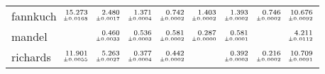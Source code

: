 \documentclass[a4paper,UKenglish]{lipics-v2016}
\begin{document}
\begin{table*}
\begin{adjustbox}{width=1.2\textwidth,center}
\begin{tabular}{lrrrrrrrr}
fannkuch&$\substack{\mathmakebox[.7cm][r]{15.273}\\{\mathmakebox[.7cm][r]{\scriptscriptstyle \pm 0.0168}}}$&$\substack{\mathmakebox[.7cm][r]{2.480}\\{\mathmakebox[.7cm][r]{\scriptscriptstyle \pm 0.0017}}}$&$\substack{\mathmakebox[.7cm][r]{1.371}\\{\mathmakebox[.7cm][r]{\scriptscriptstyle \pm 0.0004}}}$&$\substack{\mathmakebox[.7cm][r]{0.742}\\{\mathmakebox[.7cm][r]{\scriptscriptstyle \pm 0.0002}}}$&$\substack{\mathmakebox[.7cm][r]{1.403}\\{\mathmakebox[.7cm][r]{\scriptscriptstyle \pm 0.0002}}}$&$\substack{\mathmakebox[.7cm][r]{1.393}\\{\mathmakebox[.7cm][r]{\scriptscriptstyle \pm 0.0002}}}$&$\substack{\mathmakebox[.7cm][r]{0.746}\\{\mathmakebox[.7cm][r]{\scriptscriptstyle \pm 0.0002}}}$&$\substack{\mathmakebox[.7cm][r]{10.676}\\{\mathmakebox[.7cm][r]{\scriptscriptstyle \pm 0.0092}}}$\\
\addlinespace
mandel&&$\substack{\mathmakebox[.7cm][r]{0.460}\\{\mathmakebox[.7cm][r]{\scriptscriptstyle \pm 0.0033}}}$&$\substack{\mathmakebox[.7cm][r]{0.536}\\{\mathmakebox[.7cm][r]{\scriptscriptstyle \pm 0.0003}}}$&$\substack{\mathmakebox[.7cm][r]{0.581}\\{\mathmakebox[.7cm][r]{\scriptscriptstyle \pm 0.0002}}}$&$\substack{\mathmakebox[.7cm][r]{0.287}\\{\mathmakebox[.7cm][r]{\scriptscriptstyle \pm 0.0000}}}$&$\substack{\mathmakebox[.7cm][r]{0.581}\\{\mathmakebox[.7cm][r]{\scriptscriptstyle \pm 0.0001}}}$&&$\substack{\mathmakebox[.7cm][r]{4.211}\\{\mathmakebox[.7cm][r]{\scriptscriptstyle \pm 0.0112}}}$\\
\addlinespace
richards&$\substack{\mathmakebox[.7cm][r]{11.901}\\{\mathmakebox[.7cm][r]{\scriptscriptstyle \pm 0.0055}}}$&$\substack{\mathmakebox[.7cm][r]{5.263}\\{\mathmakebox[.7cm][r]{\scriptscriptstyle \pm 0.0027}}}$&$\substack{\mathmakebox[.7cm][r]{0.377}\\{\mathmakebox[.7cm][r]{\scriptscriptstyle \pm 0.0004}}}$&$\substack{\mathmakebox[.7cm][r]{0.442}\\{\mathmakebox[.7cm][r]{\scriptscriptstyle \pm 0.0002}}}$&&$\substack{\mathmakebox[.7cm][r]{0.392}\\{\mathmakebox[.7cm][r]{\scriptscriptstyle \pm 0.0003}}}$&$\substack{\mathmakebox[.7cm][r]{0.216}\\{\mathmakebox[.7cm][r]{\scriptscriptstyle \pm 0.0002}}}$&$\substack{\mathmakebox[.7cm][r]{10.709}\\{\mathmakebox[.7cm][r]{\scriptscriptstyle \pm 0.0091}}}$\\

\end{tabular}
\end{adjustbox}
\end{table*}
\end{document}
